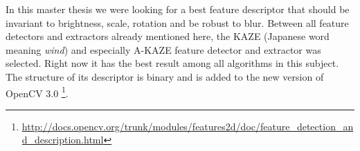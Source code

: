 In this master thesis we were looking for a best feature descriptor that should be invariant to brightness, scale, rotation and be robust to blur. Between all feature detectors and extractors already mentioned here, the KAZE (Japanese word meaning \emph{wind}) and especially A-KAZE feature detector and extractor was selected. Right now it has the best result among all algorithms in this subject. The structure of its descriptor is binary and is added to the new version of OpenCV 3.0 \footnote{\url{http://docs.opencv.org/trunk/modules/features2d/doc/feature_detection_and_description.html}}.
